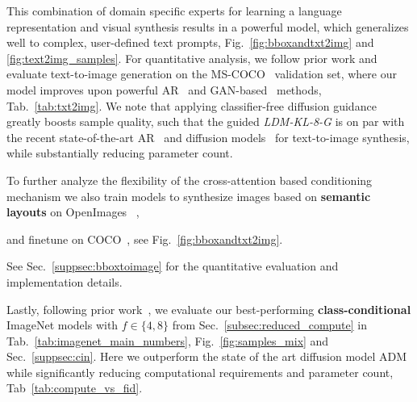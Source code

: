 This combination of domain specific experts for learning a language representation and visual synthesis results in a powerful model, which generalizes well to complex, user-defined text prompts, \cf Fig.~\ref{fig:bboxandtxt2img} and \ref{fig:text2img_samples}. 
For quantitative analysis, we follow prior work and evaluate text-to-image generation on the MS-COCO~\cite{DBLP:journals/corr/LinMBHPRDZ14} validation set, where our model improves upon powerful AR~\cite{DBLP:journals/corr/abs-2102-12092,DBLP:journals/corr/abs-2105-13290} and GAN-based~\cite{DBLP:journals/corr/abs-2111-13792} methods, \cf Tab.~\ref{tab:txt2img}. We note that applying classifier-free diffusion guidance~\cite{ho2021classifier} greatly boosts sample quality, such that the guided \emph{LDM-KL-8-G} is on par with the recent state-of-the-art AR~\cite{DBLP:journals/corr/abs-2203-13131} and diffusion models~\cite{DBLP:journals/corr/abs-2112-10741} for text-to-image synthesis, while substantially reducing parameter count.

To further analyze the flexibility of the cross-attention based conditioning mechanism we also train models to synthesize images based on \textbf{semantic layouts} on OpenImages ~\cite{DBLP:journals/corr/abs-1811-00982},

and finetune on COCO~\cite{DBLP:conf/cvpr/CaesarUF18}, see Fig.~\ref{fig:bboxandtxt2img}.

See Sec.~\ref{suppsec:bboxtoimage} for the quantitative evaluation and implementation details.

Lastly, following prior work~\cite{DBLP:journals/corr/abs-2105-05233,bigganbrock,DBLP:journals/corr/abs-2012-09841,DBLP:journals/corr/abs-2108-08827}, we evaluate our best-performing \textbf{class-conditional} ImageNet models with $f\in\{4,8\}$ from Sec.~\ref{subsec:reduced_compute} 
in Tab.~\ref{tab:imagenet_main_numbers}, Fig.~\ref{fig:samples_mix} and 
Sec.~\ref{suppsec:cin}. Here we outperform the state of the art diffusion model ADM~\cite{DBLP:journals/corr/abs-2105-05233} while significantly reducing computational requirements and parameter count, \cf Tab~\ref{tab:compute_vs_fid}.

